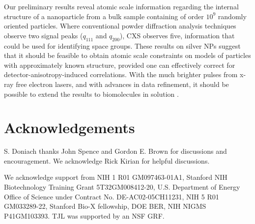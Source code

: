 \documentclass [11pt,fleqn]{article}
\begin{document}
Our preliminary results reveal atomic scale information regarding the internal structure of a nanoparticle from a bulk sample containing of order $10^9$ randomly oriented particles. Where conventional powder diffraction analysis techniques observe two signal peaks ($q_{111}$ and $q_{200}$), CXS observes five, information that could be used for identifying space groups. These results on silver NPs suggest that it should be feasible to obtain atomic scale constraints on models of particles with approximately known structure, provided one can effectively correct for detector-anisotropy-induced correlations. With the much brighter pulses from x-ray free electron lasers, and with advances in data refinement, it should be possible to extend the results to biomolecules in solution \cite{Neutze:2000ih, Spence:2012eo}. 

\section{Acknowledgements}
S. Doniach thanks John Spence and Gordon E. Brown for discussions and encouragement. We acknowledge Rick Kirian for helpful discussions.

We acknowledge support from NIH 1 R01 GM097463-01A1, Stanford NIH Biotechnology Training Grant 5T32GM008412-20, U.S. Department of Energy Office of Science under Contract No. DE-AC02-05CH11231, NIH 5 R01 GM033289-22, Stanford Bio-X fellowship, DOE BER, NIH NIGMS P41GM103393. TJL was supported by an NSF GRF.
\end{document}
